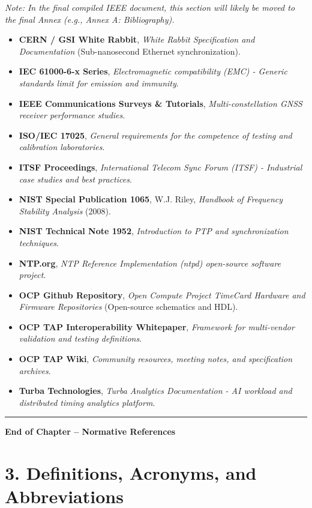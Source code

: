 \emph{Note: In the final compiled IEEE document, this section will
likely be moved to the final Annex (e.g., Annex A: Bibliography).}

\begin{itemize}
\tightlist
\item
  \textbf{CERN / GSI White Rabbit}, \emph{White Rabbit Specification and
  Documentation} (Sub-nanosecond Ethernet synchronization).
\item
  \textbf{IEC 61000-6-x Series}, \emph{Electromagnetic compatibility
  (EMC) - Generic standards limit for emission and immunity}.
\item
  \textbf{IEEE Communications Surveys \& Tutorials},
  \emph{Multi-constellation GNSS receiver performance studies}.
\item
  \textbf{ISO/IEC 17025}, \emph{General requirements for the competence
  of testing and calibration laboratories}.
\item
  \textbf{ITSF Proceedings}, \emph{International Telecom Sync Forum
  (ITSF) - Industrial case studies and best practices}.
\item
  \textbf{NIST Special Publication 1065}, W.J. Riley, \emph{Handbook of
  Frequency Stability Analysis} (2008).
\item
  \textbf{NIST Technical Note 1952}, \emph{Introduction to PTP and
  synchronization techniques}.
\item
  \textbf{NTP.org}, \emph{NTP Reference Implementation (ntpd)
  open-source software project}.
\item
  \textbf{OCP Github Repository}, \emph{Open Compute Project TimeCard
  Hardware and Firmware Repositories} (Open-source schematics and HDL).
\item
  \textbf{OCP TAP Interoperability Whitepaper}, \emph{Framework for
  multi-vendor validation and testing definitions}.
\item
  \textbf{OCP TAP Wiki}, \emph{Community resources, meeting notes, and
  specification archives}.
\item
  \textbf{Turba Technologies}, \emph{Turba Analytics Documentation - AI
  workload and distributed timing analytics platform}.
\end{itemize}

\begin{center}\rule{0.5\linewidth}{0.5pt}\end{center}

\textbf{End of Chapter -- Normative References}

\section{3. Definitions, Acronyms, and
Abbreviations}\label{definitions-acronyms-and-abbreviations}

